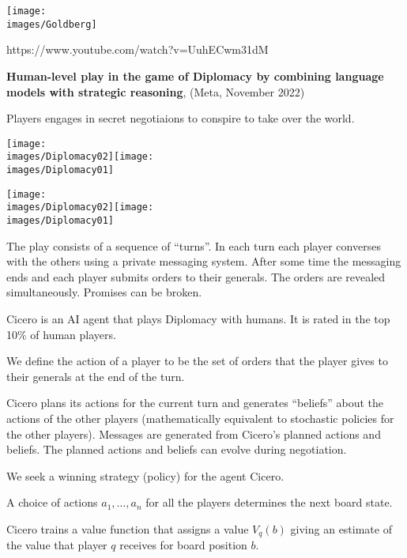 {\centerline{\texttt{[image: \\images/Goldberg]}}


https://www.youtube.com/watch?v=UuhECwm31dM


{\bf Human-level play in the game of Diplomacy by combining language models with strategic reasoning}, (Meta, November 2022)

\vfill
Players engages in secret negotiaions to conspire to take over the world.

\vfill
\centerline{\texttt{[image: \\images/Diplomacy02]}\hfill\texttt{[image: \\images/Diplomacy01]}}


\vfill
\centerline{\texttt{[image: \\images/Diplomacy02]}\hspace{4em}\texttt{[image: \\images/Diplomacy01]}}

\vfill
The play consists of a sequence of ``turns''.  In each turn each player converses with the others using a private messaging system.  After some time the messaging ends and each player submits orders to their generals.  The orders are revealed simultaneously. Promises can be broken.



Cicero is an AI agent that plays Diplomacy with humans.  It is rated in the top 10\% of human players.



We define the action of a player to be the set of orders that the player gives to their generals at the end of the turn.

\vfill
Cicero plans its actions for the current turn and generates ``beliefs'' about the actions of the other players (mathematically equivalent
to stochastic policies for the other players).  Messages are generated from Cicero's planned actions and beliefs.  The planned actions
and beliefs can evolve during negotiation.


We seek a winning strategy (policy) for the agent Cicero.

\vfill
A choice of actions $a_1,\ldots,a_n$ for all the players determines the next board state.

\vfill
Cicero trains a value function that assigns a value $V_q(b)$ giving an estimate of the value that player $q$ receives 
for board position $b$.

}
